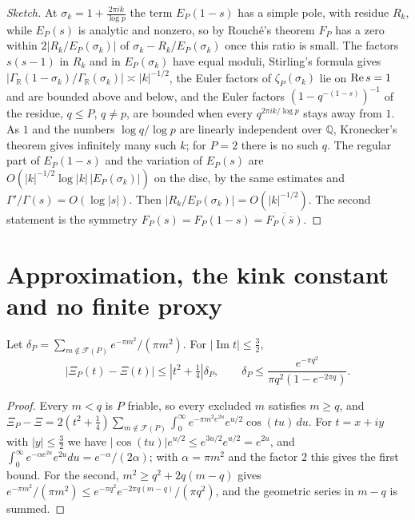 \begin{proof}[Sketch]
At $\sigma_k=1+\frac{2\pi ik}{\log p}$ the term $E_P(1-s)$ has a simple pole, with residue $R_k$, while $E_P(s)$ is analytic and nonzero, so by Rouch\'e's theorem $F_P$ has a zero within $2|R_k/E_P(\sigma_k)|$ of $\sigma_k-R_k/E_P(\sigma_k)$ once this ratio is small. The factors $s(s-1)$ in $R_k$ and in $E_P(\sigma_k)$ have equal moduli, Stirling's formula gives $|\Gamma_{\mathbb R}(1-\sigma_k)/\Gamma_{\mathbb R}(\sigma_k)|\asymp|k|^{-1/2}$, the Euler factors of $\zeta_P(\sigma_k)$ lie on $\operatorname{Re} s=1$ and are bounded above and below, and the Euler factors $(1-q^{-(1-s)})^{-1}$ of the residue, $q\le P$, $q\ne p$, are bounded when every $q^{2\pi ik/\log p}$ stays away from $1$. As $1$ and the numbers $\log q/\log p$ are linearly independent over $\mathbb Q$, Kronecker's theorem gives infinitely many such $k$; for $P=2$ there is no such $q$. The regular part of $E_P(1-s)$ and the variation of $E_P(s)$ are $O(|k|^{-1/2}\log|k|\,|E_P(\sigma_k)|)$ on the disc, by the same estimates and $\Gamma'/\Gamma(s)=O(\log|s|)$. Then $|R_k/E_P(\sigma_k)|=O(|k|^{-1/2})$. The second statement is the symmetry $F_P(s)=F_P(1-s)=\overline{F_P(\bar s)}$.
\end{proof}

\section{Approximation, the kink constant and no finite proxy}\label{mi:sec:approx}

\begin{theorem}\label{mi:thm:approx}
Let $\delta_P=\sum_{m\notin\mathcal F(P)}e^{-\pi m^2}/(\pi m^2)$. For $|\operatorname{Im}t|\le\tfrac32$,
\[
|\Xi_P(t)-\Xi(t)|\le\left|t^2+\tfrac14\right|\delta_P,\qquad\delta_P\le\frac{e^{-\pi q^2}}{\pi q^2(1-e^{-2\pi q})}.
\]
\end{theorem}

\begin{proof}
Every $m<q$ is $P$ friable, so every excluded $m$ satisfies $m\ge q$, and $\Xi_P-\Xi=2(t^2+\tfrac14)\sum_{m\notin\mathcal F(P)}\int_0^\infty e^{-\pi m^2e^{2u}}e^{u/2}\cos(tu)\,du$. For $t=x+iy$ with $|y|\le\frac32$ we have $|\cos(tu)|e^{u/2}\le e^{3u/2}e^{u/2}=e^{2u}$, and $\int_0^\infty e^{-\alpha e^{2u}}e^{2u}du=e^{-\alpha}/(2\alpha)$; with $\alpha=\pi m^2$ and the factor $2$ this gives the first bound. For the second, $m^2\ge q^2+2q(m-q)$ gives $e^{-\pi m^2}/(\pi m^2)\le e^{-\pi q^2}e^{-2\pi q(m-q)}/(\pi q^2)$, and the geometric series in $m-q$ is summed.
\end{proof}

